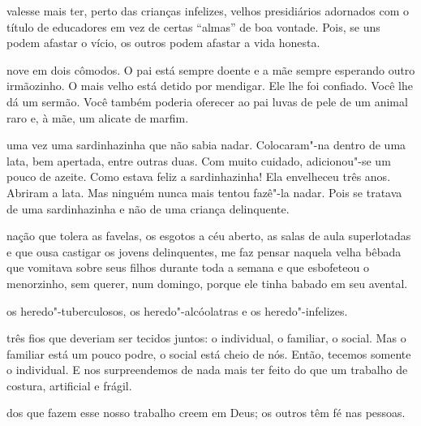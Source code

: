  valesse mais ter, perto das crianças infelizes, velhos
presidiários adornados com o título de educadores em vez de certas
``almas'' de boa vontade. Pois, se uns podem afastar o vício, os outros
podem afastar a vida honesta.

\bigskip
\bigskip

 nove em dois cômodos. O pai está sempre doente e a mãe sempre
esperando outro irmãozinho. O mais velho está detido por mendigar. Ele
lhe foi confiado. Você lhe dá um sermão. Você também poderia oferecer ao
pai luvas de pele de um animal raro e, à mãe, um alicate de marfim.

\bigskip
\bigskip

 uma vez uma sardinhazinha que não sabia nadar. Colocaram"-na dentro
de uma lata, bem apertada, entre outras duas. Com muito cuidado,
adicionou"-se um pouco de azeite. Como estava feliz a sardinhazinha! Ela
envelheceu três anos. Abriram a lata. Mas ninguém nunca mais tentou
fazê"-la nadar. Pois se tratava de uma sardinhazinha e não de uma criança
delinquente.

\bigskip
\bigskip

\pagebreak

 nação que tolera as favelas, os esgotos a céu aberto, as salas de
aula superlotadas e que ousa castigar os jovens delinquentes, me faz
pensar naquela velha bêbada que vomitava sobre seus filhos durante toda
a semana e que esbofeteou o menorzinho, sem querer, num domingo, porque
ele tinha babado em seu avental.

\bigskip
\bigskip


 os heredo"-tuberculosos, os heredo"-alcóolatras e os heredo"-infelizes.


\bigskip
\bigskip

 três fios que deveriam ser tecidos juntos: o individual, o familiar,
o social. Mas o familiar está um pouco podre, o social está cheio de
nós. Então, tecemos somente o individual. E nos surpreendemos de nada
mais ter feito do que um trabalho de costura, artificial e frágil.

\bigskip
\bigskip

 dos que fazem esse nosso trabalho creem em Deus; os outros têm fé
nas pessoas.

\bigskip
\bigskip

